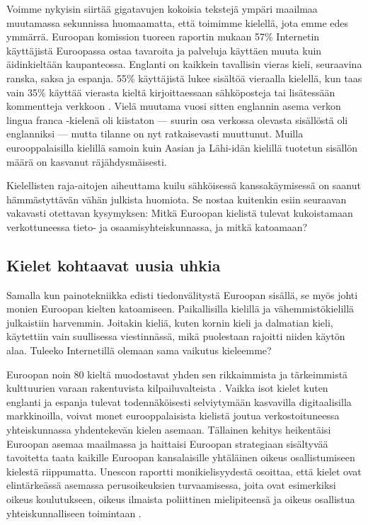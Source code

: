 \documentclass[]{../../metanetpaper}
\begin{document}
\begin{multicols}{2}
Voimme nykyisin siirtää gigatavujen kokoisia tekstejä ympäri maailmaa
muutamassa sekunnissa huomaamatta, että toimimme kielellä, jota emme
edes ymmärrä. Euroopan komission tuoreen raportin mukaan 57\%
Internetin käyttäjistä Euroopassa ostaa tavaroita ja palveluja
käyttäen muuta kuin äidinkieltään kaupanteossa. Englanti on kaikkein
tavallisin vieras kieli, seuraavina ranska, saksa ja espanja. 55\%
käyttäjistä lukee sisältöä vieraalla kielellä, kun taas vain 35\%
käyttää vierasta kieltä kirjoittaessaan sähköposteja tai lisätessään
kommentteja verkkoon \cite{EC-prefer}. Vielä muutama vuosi sitten
englannin asema verkon lingua franca -kielenä oli kiistaton — suurin
osa verkossa olevasta sisällöstä oli englanniksi — mutta tilanne on
nyt ratkaisevasti muuttunut. Muilla eurooppalaisilla kielillä samoin
kuin Aasian ja Lähi-idän kielillä tuotetun sisällön määrä on
kasvanut räjähdysmäisesti.

Kielellisten raja-aitojen aiheuttama kuilu sähköisessä kanssakäymisessä  
on saanut hämmästyttävän vähän julkista huomiota. Se nostaa kuitenkin
esiin seuraavan vakavasti otettavan kysymyksen: Mitkä Euroopan kielistä  
tulevat kukoistamaan verkottuneessa tieto- ja osaamisyhteiskunnassa, ja mitkä katoamaan?


\subsection{Kielet kohtaavat uusia uhkia}


Samalla kun painotekniikka edisti tiedonvälitystä Euroopan
sisällä, se myös johti monien Euroopan kielten katoamiseen. 
Paikallisilla kielillä ja vähemmistökielillä julkaistiin
harvemmin. Joitakin kieliä, kuten kornin kieli ja dalmatian
kieli, käytettiin vain suullisessa viestinnässä, mikä puolestaan
rajoitti niiden käytön alaa. Tuleeko Internetillä olemaan sama
vaikutus kieleemme?

Euroopan noin 80 kieltä muodostavat yhden sen rikkaimmista ja
tärkeimmistä kulttuurien varaan rakentuvista kilpailuvalteista
\cite{EC-multi}. Vaikka isot kielet kuten englanti ja espanja tulevat
todennäköisesti selviytymään kasvavilla digitaalisilla markkinoilla,
voivat monet eurooppalaisista kielistä joutua verkostoituneessa
yhteiskunnassa yhdentekevän kielen asemaan. Tällainen kehitys
heikentäisi Euroopan asemaa maailmassa ja haittaisi Euroopan
strategiaan sisältyvää tavoitetta taata kaikille Euroopan kansalaisille
yhtäläinen oikeus osallistumiseen kielestä riippumatta. 
Unescon raportti monikielisyydestä osoittaa, että kielet
ovat elintärkeässä asemassa perusoikeuksien turvaamisessa, joita ovat
esimerkiksi oikeus koulutukseen, oikeus ilmaista poliittinen mielipiteensä 
ja oikeus osallistua yhteiskunnalliseen toimintaan \cite{UN-mid}.



\end{multicols}
\end{document}
